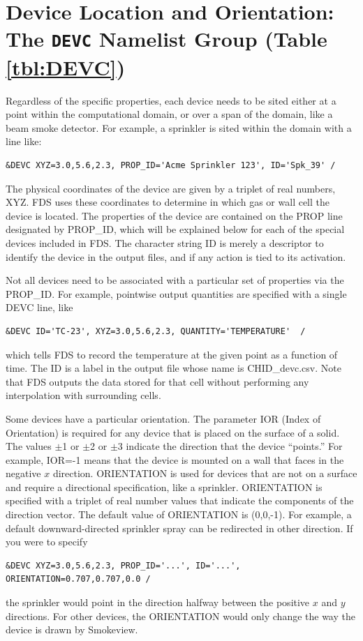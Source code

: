 \documentclass[11pt]{book}
\begin{document}
\section{Device Location and Orientation: The \texorpdfstring{{\tt DEVC}}{DEVC} Namelist Group (Table \ref{tbl:DEVC})}
\label{info:DEVC}

Regardless of the specific properties, each device needs to be sited either at a point within the computational domain, or
over a span of the domain, like a beam smoke detector. For example, a sprinkler is sited within the domain with a line like:
\begin{lstlisting}
&DEVC XYZ=3.0,5.6,2.3, PROP_ID='Acme Sprinkler 123', ID='Spk_39' /
\end{lstlisting}
The physical coordinates of the device are given by a triplet of real numbers, {\ct XYZ}.  FDS uses these coordinates to determine in which gas or wall cell the device is located. The properties of the device are contained on the {\ct PROP} line designated by {\ct PROP\_ID}, which will be explained below for each of the special devices included in FDS. The character string {\ct ID} is merely a descriptor to identify the device in the output files, and if any action is tied to its activation.

Not all devices need to be associated with a particular set of properties via the {\ct PROP\_ID}. For example, pointwise output quantities are specified with a single {\ct DEVC} line, like
\begin{lstlisting}
&DEVC ID='TC-23', XYZ=3.0,5.6,2.3, QUANTITY='TEMPERATURE'  /
\end{lstlisting}
which tells FDS to record the temperature at the given point as a function of time. The {\ct ID} is a label in the output file whose name is {\ct CHID\_devc.csv}. Note that FDS outputs the data stored for that cell without performing any interpolation with surrounding cells.

Some devices have a particular orientation. The parameter {\ct IOR} (Index of Orientation) is required for any device that is placed on the surface of a solid. The values $\pm$1 or $\pm$2 or $\pm$3 indicate the direction that the device ``points.'' For example, {\ct IOR=-1} means that the device is mounted on a wall that faces in the negative $x$ direction. {\ct ORIENTATION} is used for devices that are not on a surface and require a directional specification, like a sprinkler. {\ct ORIENTATION} is specified with a triplet of real number values that indicate the components of the direction vector. The default value of {\ct ORIENTATION} is (0,0,-1). For example, a default downward-directed sprinkler spray can be redirected in other direction.
If you were to specify
\begin{lstlisting}
&DEVC XYZ=3.0,5.6,2.3, PROP_ID='...', ID='...', ORIENTATION=0.707,0.707,0.0 /
\end{lstlisting}
the sprinkler would point in the direction halfway between the positive $x$ and $y$ directions. For other devices, the {\ct ORIENTATION} would only change the way the device is drawn by Smokeview.
\end{document}
